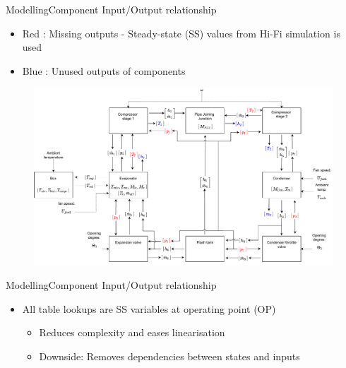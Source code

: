 
\begin{frame}{Modelling}{Component Input/Output relationship}
	\begin{itemize}
		\item \color{red} Red \color{black}: Missing outputs - Steady-state (SS) values from Hi-Fi simulation is used
		\item \color{blue} Blue \color{black}: Unused outputs of components
	\end{itemize}
	\begin{figure}[h!]
		\centering
		\includegraphics[width=1.04\textwidth]{../Graphics/Block_Diagram_inout_flowValveVersion.pdf}
		\label{fig:Block_diagram_inout}
	\end{figure}
	
\end{frame}


\begin{frame}{Modelling}{Component Input/Output relationship}
	\begin{itemize}
		\item All table lookups are SS variables at operating point (OP)
			\begin{itemize}
				\item Reduces complexity and eases linearisation
				\item Downside: Removes dependencies between states and inputs
			\end{itemize}
	\end{itemize}
\end{frame}





